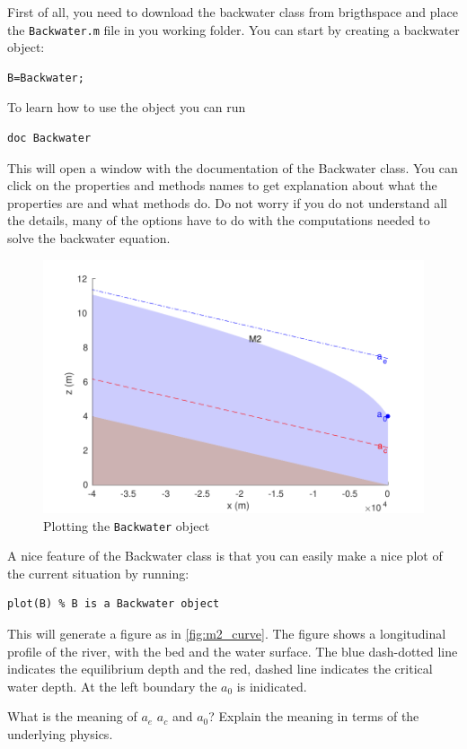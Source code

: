 \documentclass[a4paper]{article}
\begin{document}
First of all, you need to download the backwater class from brigthspace and place the \lstinline=Backwater.m= file in you working folder. You can start by creating a backwater object:
\begin{lstlisting}
B=Backwater;
\end{lstlisting}
To learn how to use the object you can run
\begin{lstlisting}
doc Backwater
\end{lstlisting}
This will open a window with the documentation of the Backwater class. You can click on the properties and methods names to get explanation about what the properties are and what methods do. Do not worry if you do not understand all the details, many of the options have to do with the computations needed to solve the backwater equation.
\begin{figure}[h]
  \centering
  \includegraphics{m2_curve.pdf}
  \caption{Plotting the \lstinline{Backwater} object}
  \label{fig:m2_curve}
\end{figure}

A nice feature of the Backwater class is that you can easily make a nice plot of the current situation by running:
\begin{lstlisting}
plot(B) % B is a Backwater object
\end{lstlisting}
This will generate a figure as in \autoref{fig:m2_curve}. The figure shows a longitudinal profile of the river, with the bed and the water surface. The blue dash-dotted line indicates the equilibrium depth and the red, dashed line indicates the critical water depth. At the left boundary the $a_0$ is inidicated.
\begin{exercise}
  What is the meaning of $a_e$ $a_c$ and $a_0$? Explain the meaning in terms of the underlying physics.
\end{exercise}
\end{document}
